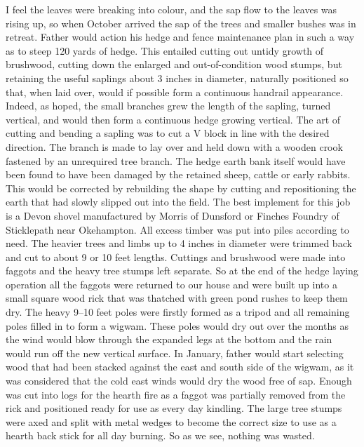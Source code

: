I feel the leaves were breaking into colour, and the sap flow to the leaves was
rising up, so when October arrived the sap of the trees and smaller bushes was
in retreat. Father would action his hedge and fence maintenance plan in such a
way as to steep 120 yards of hedge. This entailed cutting out untidy growth of
brushwood, cutting down the enlarged and out-of-condition wood stumps, but
retaining the useful saplings about 3 inches in diameter, naturally positioned
so that, when laid over, would if possible form a continuous handrail
appearance. Indeed, as hoped, the small branches grew the length of the
sapling, turned vertical, and would then form a continuous hedge growing
vertical. The art of cutting and bending a sapling was to cut a V block in line
with the desired direction. The branch is made to lay over and held down with a
wooden crook fastened by an unrequired tree branch. The hedge earth bank itself
would have been found to have been damaged by the retained sheep, cattle or
early rabbits. This would be corrected by rebuilding the shape by cutting and
repositioning the earth that had slowly slipped out into the field. The best
implement for this job is a Devon shovel manufactured by Morris of Dunsford or
Finches Foundry of Sticklepath near Okehampton. All excess timber was put into
piles according to need. The heavier trees and limbs up to 4 inches in diameter
were trimmed back and cut to about 9 or 10 feet lengths. Cuttings and brushwood
were made into faggots and the heavy tree stumps left separate. So at the end
of the hedge laying operation all the faggots were returned to our house and
were built up into a small square wood rick that was thatched with green pond
rushes to keep them dry. The heavy 9--10 feet poles were firstly formed as a
tripod and all remaining poles filled in to form a wigwam. These poles would
dry out over the months as the wind would blow through the expanded legs at the
bottom and the rain would run off the new vertical surface. In January, father
would start selecting wood that had been stacked against the east and south
side of the wigwam, as it was considered that the cold east winds would dry the
wood free of sap. Enough was cut into logs for the hearth fire as a faggot was
partially removed from the rick and positioned ready for use as every day
kindling. The large tree stumps were axed and split with metal wedges to become
the correct size to use as a hearth back stick for all day burning. So as we
see, nothing was wasted.

